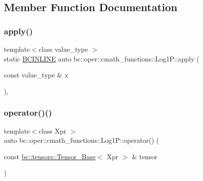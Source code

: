 \subsection{Member Function Documentation}
\mbox{\label{structbc_1_1oper_1_1cmath__functions_1_1Log1P_a531afd3e8c84b4fbd946c4a82108f578}} 
\subsubsection{\texorpdfstring{apply()}{apply()}}
{\footnotesize\ttfamily template$<$class value\+\_\+type $>$ \\
static \hyperlink{common_8h_a6699e8b0449da5c0fafb878e59c1d4b1}{B\+C\+I\+N\+L\+I\+NE} auto bc\+::oper\+::cmath\+\_\+functions\+::\+Log1\+P\+::apply (\begin{DoxyParamCaption}\item[{const value\+\_\+type \&}]{x }\end{DoxyParamCaption})\hspace{0.3cm}{\ttfamily [inline]}, {\ttfamily [static]}}

\mbox{\label{structbc_1_1oper_1_1cmath__functions_1_1Log1P_a0f6da7067eb60ebb9efce890a02ecc9b}} 
\subsubsection{\texorpdfstring{operator()()}{operator()()}\hspace{0.1cm}{\footnotesize\ttfamily [1/3]}}
{\footnotesize\ttfamily template$<$class Xpr $>$ \\
auto bc\+::oper\+::cmath\+\_\+functions\+::\+Log1\+P\+::operator() (\begin{DoxyParamCaption}\item[{const \hyperlink{classbc_1_1tensors_1_1Tensor__Base}{bc\+::tensors\+::\+Tensor\+\_\+\+Base}$<$ Xpr $>$ \&}]{tensor }\end{DoxyParamCaption})\hspace{0.3cm}{\ttfamily [inline]}}

